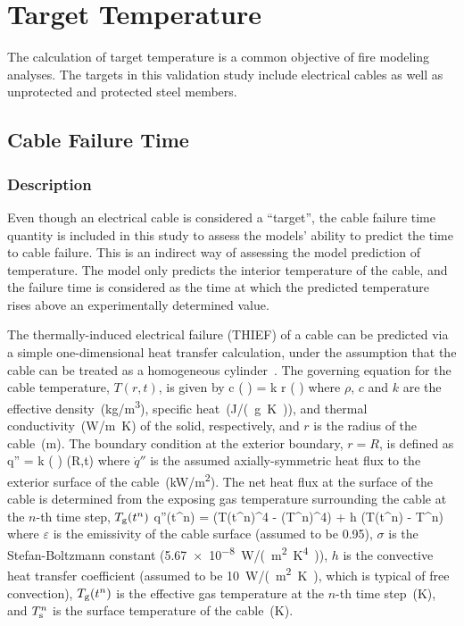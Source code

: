 
\chapter{Target Temperature}
\label{Target_Temperature_Chapter}

The calculation of target temperature is a common objective of fire modeling analyses. The targets in this validation study include electrical cables as well as unprotected and protected steel members.

\section{Cable Failure Time}

\subsection*{Description}

Even though an electrical cable is considered a ``target'', the cable failure time quantity is included in this study to assess the models' ability to predict the time to cable failure. This is an indirect way of assessing the model prediction of temperature. The model only predicts the interior temperature of the cable, and the failure time is considered as the time at which the predicted temperature rises above an experimentally determined value.

The thermally-induced electrical failure (THIEF) of a cable can be predicted via a simple one-dimensional heat transfer calculation, under the assumption that the cable can be treated as a homogeneous cylinder~\cite{CAROLFIRE}. The governing equation for the cable temperature,
$T(r,t)$, is given by
\be
\rho c \left(  \right) =   k r \left(  \right)
\label{eq:cable_temp}
\ee
where $\rho$, $c$ and $k$ are the effective density~(\si{kg/m^3}), specific heat~(\si{J/(g.K)}), and thermal conductivity~(\si{W/m.K}) of the solid, respectively, and $r$ is the radius of the cable~(\si{m}).
The boundary condition at the exterior boundary, $r = R$, is defined as
\be
\dot q'' = k \left(  \right) (R,t)
\ee
where $\dot q''$ is the assumed axially-symmetric heat flux to the exterior surface of the cable~(\si{kW/m^2}).
The net heat flux at the surface of the cable is determined from the exposing gas temperature surrounding the cable at the $n$-th time step, $T\sb{g}(t^n)$
\be
\dot q''(t^n) = \varepsilon \sigma (T(t^n)^4 - (T^n)^4) + h (T(t^n) - T^n)
\label{eq:cable_net_heat_flux}
\ee
where $\varepsilon$ is the emissivity of the cable surface (assumed to be 0.95), $\sigma$ is the Stefan-Boltzmann constant (\SI{5.67e-8}{W/(m^2.K^4)}), $h$ is the convective heat transfer coefficient (assumed to be \SI{10}{W/(m^2.K)}, which is typical of free convection), $T\sb{g}(t^n)$ is the effective gas temperature at the $n$-th time step~(\si{K}), and $T\sb{s}^n$ is the surface temperature of the cable~(\si{K}).


